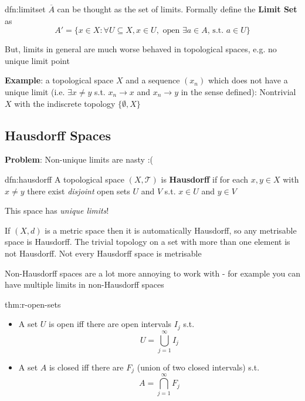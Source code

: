 \documentclass{article}
\begin{document}
\begin{dfn}{dfn:limitset}{}
    $\overline{A}$ can be thought as the set of limits. Formally define the \textbf{Limit Set} as
    \[A' = \{x\in X : \forall U \subseteq X, x\in U, \text{ open } \exists a\in A,\,\text{s.t. } a\in U\}\]
\end{dfn}

But, limits in general are much worse behaved in topological spaces, e.g. no unique limit point

\textbf{Example}: a topological space $X$ and a sequence $(x_{n})$ which does not have a unique limit (i.e. $\exists x\ne y$ s.t. $x_{n} \to x$ and $x_{n}\to y$ in the sense defined): Nontrivial $X$ with the indiscrete topology $\{\emptyset, X\}$


\newpage
\subsection{Hausdorff Spaces}

\textbf{Problem}: Non-unique limits are nasty :(

\begin{dfn}{dfn:hausdorff}{}
    A topological space $(X, \mathcal{T})$ is \textbf{Hausdorff} if for each $x, y\in X$ with $x\ne y$ there exist \textit{disjoint} open sets $U$ and $V$ s.t. $x\in U$ and $y\in V$

    This space has \textit{unique limits}!
\end{dfn}

If $(X, d)$ is a metric space then it is automatically Hausdorff, so any metrisable space is Hausdorff. The trivial topology on a set with more than one element is not Hausdorff. Not every Hausdorff space is metrisable

Non-Hausdorff spaces are a lot more annoying to work with - for example you can have multiple limits in non-Hausdorff spaces

\begin{thm}{thm:r-open-sets}{}
    \begin{itemize}
        \item A set $U$ is open iff there are open intervals $I_{j}$ s.t.
    \[U = \bigcup_{j=1}^{\infty} I_{j}\]
    \item A set $A$ is closed iff there are $F_{j}$ (union of two closed intervals) s.t.
        \[A = \bigcap_{j = 1}^{\infty} F_{j}\]
    \end{itemize}
\end{thm}
\end{document}
